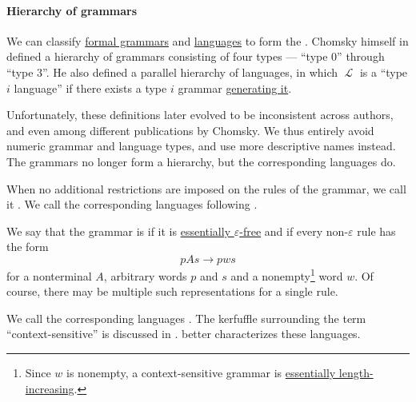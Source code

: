 \paragraph{Hierarchy of grammars}

\begin{definition}\label{def:chomsky_hierarchy}
  We can classify \hyperref[def:formal_grammar]{formal grammars} and \hyperref[def:formal_language]{languages} to form the . Chomsky himself in \cite[def. 6]{Chomsky1959} defined a hierarchy of grammars consisting of four types --- \enquote{type 0} through \enquote{type 3}. He also defined a parallel hierarchy of languages, in which \( \mscrL \) is a \enquote{type \( i \) language} if there exists a type \( i \) grammar \hyperref[def:formal_grammar/language]{generating it}.

  Unfortunately, these definitions later evolved to be inconsistent across authors, and even among different publications by Chomsky. We thus entirely avoid numeric grammar and language types, and use more descriptive names instead. The grammars no longer form a hierarchy, but the corresponding languages do.

  \begin{thmenum}
     When no additional restrictions are imposed on the rules of the grammar, we call it . We call the corresponding languages  following \cite[thm 5.4.1; thm 5.4.2]{Savage1998}.

     We say that the grammar is  if it is \hyperref[def:epsilon_free_grammar]{essentially \( \varepsilon \)-free} and if every non-\( \varepsilon \) rule has the form
    \begin{equation*}
      p A s \to p w s
    \end{equation*}
    for a nonterminal \( A \), arbitrary words \( p \) and \( s \) and a nonempty\footnote{Since \( w \) is nonempty, a context-sensitive grammar is \hyperref[def:length_increasing_grammar]{essentially length-increasing}.} word \( w \). Of course, there may be multiple such representations for a single rule.

    We call the corresponding languages . The kerfuffle surrounding the term \enquote{context-sensitive} is discussed in .  better characterizes these languages.


\end{thmenum}
\end{definition}
